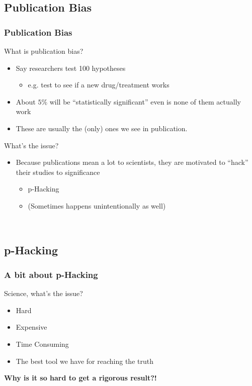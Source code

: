 \documentclass{beamer} %
\newcommand{\1}{\mathbb{1}}
\begin{document}
\subsection{Publication Bias}

\begin{frame}[t]\frametitle{Publication Bias}

What is publication bias?
\vspace{3mm}
\begin{itemize}
	\item Say researchers test 100 hypotheses
	\begin{itemize}
		\item[] e.g. test to see if a new drug/treatment works
	\end{itemize}
	\item About $5\%$ will be ``statistically significant'' even is none of them actually work
	\item These are usually the (only) ones we see in publication.
\end{itemize}
What's the issue? 
\begin{itemize}
	\item Because publications mean a lot to scientists, they are motivated to ``hack'' their studies to significance
	\begin{itemize}
		\item p-Hacking
		\item (Sometimes happens unintentionally as well)
	\end{itemize}
\end{itemize}

\href{http://marginalrevolution.com/marginalrevolution/2016/07/results-free-review.html}
{}\\	
\end{frame}


\subsection{p-Hacking}

\begin{frame}[t]\frametitle{A bit about p-Hacking}

Science, what's the issue?  %
\begin{itemize}
	\item Hard 
	\item Expensive 
	\item Time Consuming %
	\item The best tool we have for reaching the truth 
\end{itemize}
\vspace{3mm}
{\bf{Why is it so hard to get a rigorous result?!}}
\vspace{3mm}

\href{http://fivethirtyeight.com/features/science-isnt-broken/}
{}\\	
\end{frame}
\end{document}
